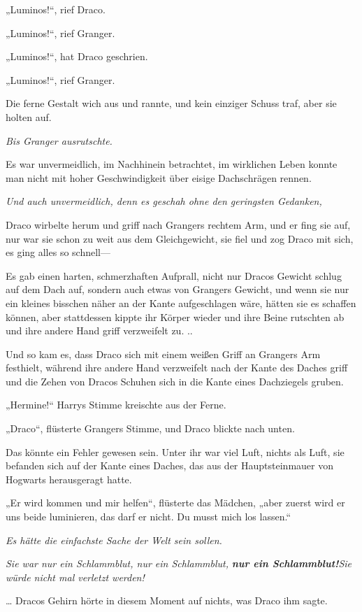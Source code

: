 {„Luminos!“, rief Draco.

„Luminos!“, rief Granger.

„Luminos!“, hat Draco geschrien.

„Luminos!“, rief Granger.

Die ferne Gestalt wich aus und rannte, und kein einziger Schuss traf, aber sie holten auf.

\emph{\hfill\break Bis Granger ausrutschte.}

Es war unvermeidlich, im Nachhinein betrachtet, im wirklichen Leben konnte man nicht mit hoher Geschwindigkeit über eisige Dachschrägen rennen.

\emph{Und auch unvermeidlich, denn es geschah ohne den geringsten Gedanken,}

Draco wirbelte herum und griff nach Grangers rechtem Arm, und er fing sie auf, nur war sie schon zu weit aus dem Gleichgewicht, sie fiel und zog Draco mit sich, es ging alles so schnell—

Es gab einen harten, schmerzhaften Aufprall, nicht nur Dracos Gewicht schlug auf dem Dach auf, sondern auch etwas von Grangers Gewicht, und wenn sie nur ein kleines bisschen näher an der Kante aufgeschlagen wäre, hätten sie es schaffen können, aber stattdessen kippte ihr Körper wieder und ihre Beine rutschten ab und ihre andere Hand griff verzweifelt zu. ..

Und so kam es, dass Draco sich mit einem weißen Griff an Grangers Arm festhielt, während ihre andere Hand verzweifelt nach der Kante des Daches griff und die Zehen von Dracos Schuhen sich in die Kante eines Dachziegels gruben.

„Hermine!“ Harrys Stimme kreischte aus der Ferne.

„Draco“, flüsterte Grangers Stimme, und Draco blickte nach unten.

Das könnte ein Fehler gewesen sein. Unter ihr war viel Luft, nichts als Luft, sie befanden sich auf der Kante eines Daches, das aus der Hauptsteinmauer von Hogwarts herausgeragt hatte.

„Er wird kommen und mir helfen“, flüsterte das Mädchen, „aber zuerst wird er uns beide luminieren, das darf er nicht. Du musst mich los lassen.“

\emph{Es hätte die einfachste Sache der Welt sein sollen.}

\emph{Sie war nur ein Schlammblut, nur ein Schlammblut,} \textbf{\emph{nur ein Schlammblut!}}\emph{\hfill\break Sie würde nicht mal verletzt werden!}

… Dracos Gehirn hörte in diesem Moment auf nichts, was Draco ihm sagte.

}
